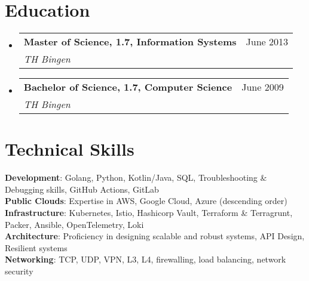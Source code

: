 \documentclass[letterpaper,11pt]{article}
\makeatletter
\newcommand{\resumeSubheading}[4]{
    \vspace{-2pt}\item
    \begin{tabular*}{0.97\textwidth}[t]{l@{\extracolsep{\fill}}r}
        \textbf{#1} & #2 \\
        \textit{\small#3} & \textit{\small #4} \\
    \end{tabular*}\vspace{-7pt}
}
\newcommand{\resumeSubHeadingListStart}{\begin{itemize}[leftmargin=0.15in, label={}]}
\newcommand{\resumeSubHeadingListEnd}{\end{itemize}}
\makeatother
\begin{document}
\section{Education}
\resumeSubHeadingListStart
\resumeSubheading
{Master of Science, 1.7, Information Systems}{June 2013}
{TH Bingen}{}

\resumeSubheading
{Bachelor of Science, 1.7, Computer Science}{June 2009}
{TH Bingen}{}
\resumeSubHeadingListEnd

%
\section{Technical Skills}
\begin{itemize}[leftmargin=0.15in, label={}]
\small{\item{
\textbf{Development}{: Golang, Python, Kotlin/Java, SQL, Troubleshooting \& Debugging skills, GitHub Actions, GitLab} \\
\textbf{Public Clouds}{: Expertise in AWS, Google Cloud, Azure (descending order)} \\
\textbf{Infrastructure}{: Kubernetes, Istio, Hashicorp Vault, Terraform \& Terragrunt, Packer, Ansible, OpenTelemetry, Loki } \\
\textbf{Architecture}{: Proficiency in designing scalable and robust systems, API Design, Resilient systems } \\
\textbf{Networking}{: TCP, UDP, VPN, L3, L4, firewalling, load balancing, network security} \\
}}
\end{itemize}


\end{document}
